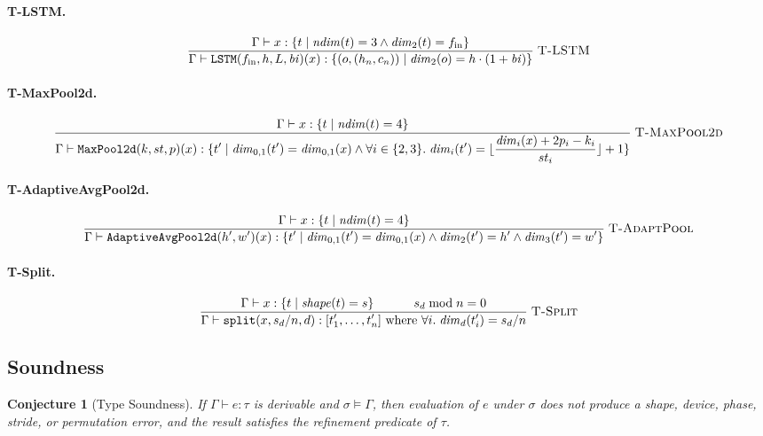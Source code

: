 \documentclass[10pt]{article}
\newcommand{\typerule}[3]{%
  \frac{\displaystyle #2}{\displaystyle #3}
  \;\textsc{#1}%
}
\theoremstyle{plain}
\newtheorem{conjecture}[theorem]{Conjecture}
\theoremstyle{definition}
\theoremstyle{remark}
\begin{document}
\paragraph{T-LSTM.}
\[
\typerule{T-LSTM}{\Gamma \vdash x : \{t \mid \mathit{ndim}(t) = 3 \land
    \mathit{dim}_2(t) = f_\text{in}\}}{\Gamma \vdash \texttt{LSTM}(f_\text{in}, h, L, \mathit{bi})(x) :
    \{(o, (h_n, c_n)) \mid \mathit{dim}_2(o) = h \cdot (1 + \mathit{bi})\}}
\]

\paragraph{T-MaxPool2d.}
\[
\typerule{T-MaxPool2d}{\Gamma \vdash x : \{t \mid \mathit{ndim}(t) = 4\}}{\Gamma \vdash \texttt{MaxPool2d}(k, st, p)(x) :
    \{t' \mid \mathit{dim}_{0,1}(t') = \mathit{dim}_{0,1}(x) \land
    \forall i \in \{2,3\}.\;
    \mathit{dim}_i(t') = \lfloor\frac{\mathit{dim}_i(x) + 2p_i -
      k_i}{st_i}\rfloor + 1\}}
\]

\paragraph{T-AdaptiveAvgPool2d.}
\[
\typerule{T-AdaptPool}{\Gamma \vdash x : \{t \mid \mathit{ndim}(t) = 4\}}{\Gamma \vdash \texttt{AdaptiveAvgPool2d}(h', w')(x) :
    \{t' \mid \mathit{dim}_{0,1}(t') = \mathit{dim}_{0,1}(x) \land
    \mathit{dim}_2(t') = h' \land \mathit{dim}_3(t') = w'\}}
\]

\paragraph{T-Split.}
\[
\typerule{T-Split}{\Gamma \vdash x : \{t \mid \mathit{shape}(t) = s\} \\
   s_d \bmod n = 0}{\Gamma \vdash \texttt{split}(x, s_d / n, d) :
    [t'_1, \ldots, t'_n] \text{ where }
    \forall i.\; \mathit{dim}_d(t'_i) = s_d / n}
\]

\subsection{Soundness}\label{sec:soundness}

\begin{conjecture}[Type Soundness]\label{conj:soundness}
If\/ $\Gamma \vdash e : \tau$ is derivable and $\sigma \models \Gamma$,
then evaluation of $e$ under $\sigma$ does not produce a shape,
device, phase, stride, or permutation error, and the result satisfies
the refinement predicate of $\tau$.
\end{conjecture}
\end{document}
